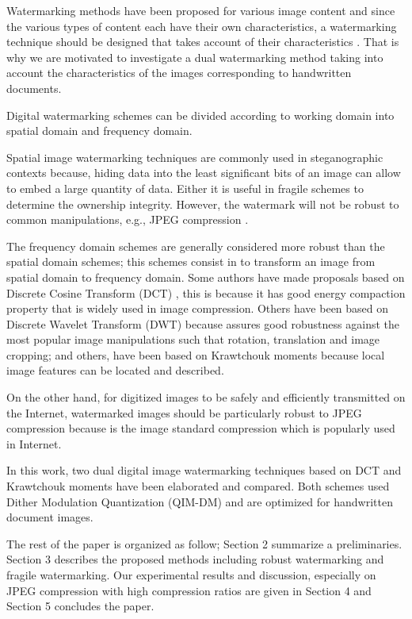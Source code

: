 \documentclass[runningheads]{llncs}
\begin{document}
Watermarking methods have been proposed for various image content and since the various types of content each have their own characteristics, a watermarking technique should be designed that takes account of their characteristics \cite{kang2018spherical}. That is why we are motivated to investigate a dual watermarking method taking into account the characteristics of the images corresponding to handwritten documents.

Digital watermarking schemes can be divided according to working domain into spatial domain and frequency domain.

Spatial image watermarking techniques are commonly used in steganographic contexts because, hiding data into the least significant bits of an image can allow to embed a large quantity of data. Either it is useful in fragile schemes to determine the ownership integrity. However, the watermark will not be robust to common manipulations, e.g., JPEG compression \cite{cardamone2018dwt}.

The frequency domain schemes are generally considered more robust than the spatial domain schemes; this schemes consist in to transform an image from spatial domain to frequency domain. Some authors have made proposals based on Discrete Cosine Transform (DCT) \cite{munoz2018robust,wang2018blind}, this is because it has good energy compaction property that is widely used in image compression. Others have been based on Discrete Wavelet Transform (DWT) \cite{cardamone2018dwt} because assures good robustness against the most popular image manipulations such that rotation, translation and image cropping; and others, have been based on Krawtchouk moments \cite{avila2018watermarking,liu2017fractional,papakostas2014moment,Yap2004} because local image features can be located and described.

On the other hand, for digitized images to be safely and efficiently transmitted on the Internet, watermarked images should be particularly robust to JPEG compression because is the image standard compression which is popularly used in Internet.

In this work, two dual digital image watermarking techniques based on DCT and Krawtchouk moments have been elaborated and compared. Both schemes used Dither Modulation Quantization (QIM-DM) and are optimized for handwritten document images. 

The rest of the paper is organized as follow; Section 2 summarize a preliminaries. Section 3 describes the proposed methods including robust watermarking and fragile watermarking. Our experimental results and discussion, especially on JPEG compression with high compression ratios are given in Section 4 and Section 5 concludes the paper.
\end{document}
